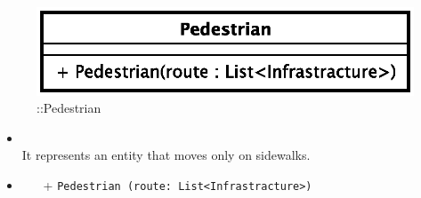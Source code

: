 \begin{figure}[h]
\centering
\includegraphics[scale=0.6,keepaspectratio]{images/solution/app/backend/pedestrian.eps}
\caption{\pActive::Pedestrian}
\label{fig:sd-app-pedestrian}
\end{figure}
\FloatBarrier
\begin{itemize}
  \item \textbf{\descr} \\
It represents an entity that moves only on sidewalks.
\item \textbf{\ops}
  \begin{itemize}
    \item[+] \texttt{Pedestrian (route: List<Infrastracture>)}
  \end{itemize}
\end{itemize} 
